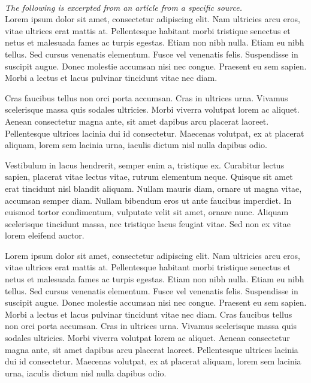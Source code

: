 \documentclass[12pt, letterpaper]{article}
\begin{document}
    \vspace{5mm}
    {}\\
    \vspace{5mm}
    \justifying
    \textit{The following is excerpted from an article from a specific source.}\vspace{2.5mm}\\
Lorem ipsum dolor sit amet, consectetur adipiscing elit. Nam ultricies arcu eros, vitae ultrices erat mattis at. Pellentesque habitant morbi tristique senectus et netus et malesuada fames ac turpis egestas. Etiam non nibh nulla. Etiam eu nibh tellus. Sed cursus venenatis elementum. Fusce vel venenatis felis. Suspendisse in suscipit augue. Donec molestie accumsan nisi nec congue. Praesent eu sem sapien. Morbi a lectus et lacus pulvinar tincidunt vitae nec diam.

Cras faucibus tellus non orci porta accumsan. Cras in ultrices urna. Vivamus scelerisque massa quis sodales ultricies. Morbi viverra volutpat lorem ac aliquet. Aenean consectetur magna ante, sit amet dapibus arcu placerat laoreet. Pellentesque ultrices lacinia dui id consectetur. Maecenas volutpat, ex at placerat aliquam, lorem sem lacinia urna, iaculis dictum nisl nulla dapibus odio.

Vestibulum in lacus hendrerit, semper enim a, tristique ex. Curabitur lectus sapien, placerat vitae lectus vitae, rutrum elementum neque. Quisque sit amet erat tincidunt nisl blandit aliquam. Nullam mauris diam, ornare ut magna vitae, accumsan semper diam. Nullam bibendum eros ut ante faucibus imperdiet. In euismod tortor condimentum, vulputate velit sit amet, ornare nunc. Aliquam scelerisque tincidunt massa, nec tristique lacus feugiat vitae. Sed non ex vitae lorem eleifend auctor.

Lorem ipsum dolor sit amet, consectetur adipiscing elit. Nam ultricies arcu eros, vitae ultrices erat mattis at. Pellentesque habitant morbi tristique senectus et netus et malesuada fames ac turpis egestas. Etiam non nibh nulla. Etiam eu nibh tellus. Sed cursus venenatis elementum. Fusce vel venenatis felis. Suspendisse in suscipit augue. Donec molestie accumsan nisi nec congue. Praesent eu sem sapien. Morbi a lectus et lacus pulvinar tincidunt vitae nec diam.
Cras faucibus tellus non orci porta accumsan. Cras in ultrices urna. Vivamus scelerisque massa quis sodales ultricies. Morbi viverra volutpat lorem ac aliquet. Aenean consectetur magna ante, sit amet dapibus arcu placerat laoreet. Pellentesque ultrices lacinia dui id consectetur. Maecenas volutpat, ex at placerat aliquam, lorem sem lacinia urna, iaculis dictum nisl nulla dapibus odio.
\end{document}
